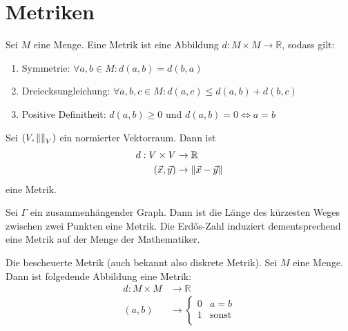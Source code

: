 \documentclass{report}
\newcommand{\bR}{\mathbb{R}}
\newcommand{\vx}{\vec{x}}
\newcommand{\vy}{\vec{y}}
\begin{document}
\section{Metriken}
\begin{definition}
 Sei $M$ eine Menge. Eine Metrik ist eine Abbildung $d : M \times M \to \bR$, sodass gilt:
 \begin{enumerate}
  \item Symmetrie: $\forall a, b \in M : d(a,b) = d(b,a)$
  \item Dreiecksungleichung: $\forall a,b,c \in M : d(a,c) \leq d(a,b) + d(b,c)$
  \item Positive Definitheit: $d(a,b) \geq 0$ und $d(a,b) = 0 \Leftrightarrow a = b$
 \end{enumerate}
\end{definition}
\begin{beispiel}
 Sei $(V, \norm{}_V)$ ein normierter Vektorraum. Dann ist 
 \begin{align*}
  d : V \times V &\to \bR\\
  (\vx, \vy) &\to \norm{\vx - \vy}
 \end{align*}
 eine Metrik.
\end{beispiel}
\begin{beispiel}
 Sei $\Gamma$ ein zusammenhängender Graph. Dann ist die Länge des kürzesten Weges zwischen zwei Punkten eine Metrik. Die Erdős-Zahl induziert dementsprechend eine Metrik auf der Menge der Mathematiker.
\end{beispiel}
\begin{beispiel}
 Die bescheuerte Metrik (auch bekannt also diskrete Metrik). Sei $M$ eine Menge. Dann ist folgedende Abbildung eine Metrik:
 \begin{align*}
  d : M \times M &\to \bR\\
      (a,b) &\to \begin{cases}
                  0 & a = b\\
                  1 & \text{sonst}\\
                 \end{cases}
 \end{align*}
\end{beispiel}
\end{document}
